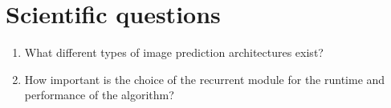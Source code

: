 \section{Scientific questions}
 \begin{enumerate}
  \item What different types of image prediction architectures exist?
  \item How important is the choice of the recurrent module for the runtime and performance of the algorithm?
 \end{enumerate}